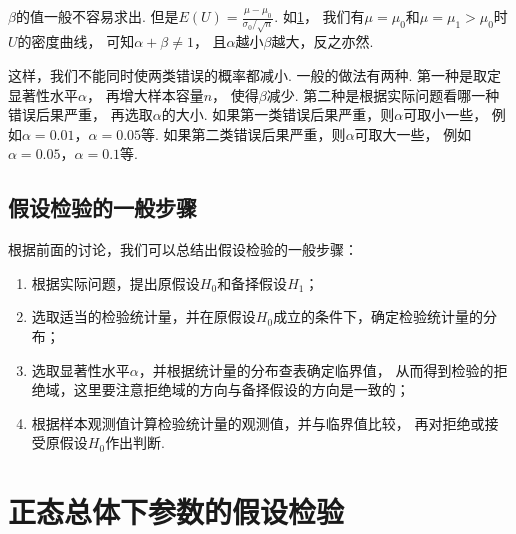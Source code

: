 \(\beta\)的值一般不容易求出.
但是\(E(U)=\frac{\mu-\mu_0}{\sigma_0/\sqrt{n}}\).
如\cref{figure:假设检验.两类错误}，
我们有\(\mu=\mu_0\)和\(\mu=\mu_1>\mu_0\)时\(U\)的密度曲线，
可知\(\alpha+\beta\neq1\)，
且\(\alpha\)越小\(\beta\)越大，反之亦然.

\begin{figure}[htb]
	\centering
	\caption{}
	\label{figure:假设检验.两类错误}
\end{figure}

这样，我们不能同时使两类错误的概率都减小.
一般的做法有两种.
第一种是取定显著性水平\(\alpha\)，
再增大样本容量\(n\)，
使得\(\beta\)减少.
第二种是根据实际问题看哪一种错误后果严重，
再选取\(\alpha\)的大小.
如果第一类错误后果严重，则\(\alpha\)可取小一些，
例如\(\alpha=0.01\)，\(\alpha=0.05\)等.
如果第二类错误后果严重，则\(\alpha\)可取大一些，
例如\(\alpha=0.05\)，\(\alpha=0.1\)等.

\subsection{假设检验的一般步骤}
根据前面的讨论，我们可以总结出假设检验的一般步骤：\begin{enumerate}
	\item 根据实际问题，提出原假设\(H_0\)和备择假设\(H_1\)；
	\item 选取适当的检验统计量，并在原假设\(H_0\)成立的条件下，确定检验统计量的分布；
	\item 选取显著性水平\(\alpha\)，并根据统计量的分布查表确定临界值，
	从而得到检验的拒绝域，这里要注意拒绝域的方向与备择假设的方向是一致的；
	\item 根据样本观测值计算检验统计量的观测值，并与临界值比较，
	再对拒绝或接受原假设\(H_0\)作出判断.
\end{enumerate}

\section{正态总体下参数的假设检验}
